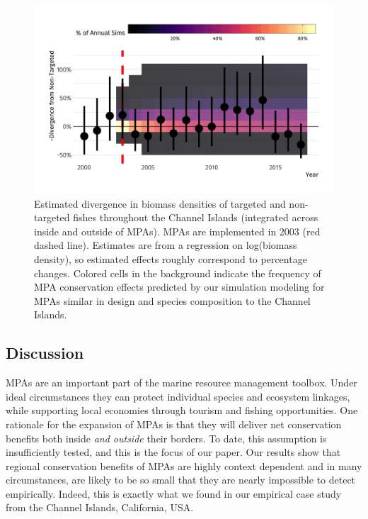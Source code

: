\documentclass[9pt,twocolumn,twoside,lineno]{pnas-new}
\begin{document}
\begin{figure}%
  \centering
  \includegraphics[width=1\linewidth]{figs/did_plot.png}
  \caption{Estimated divergence in biomass densities of targeted and non-targeted fishes throughout the Channel Islands (integrated across inside and outside of MPAs). MPAs are implemented in 2003 (red dashed line). Estimates are from a regression on log(biomass density), so estimated effects roughly correspond to percentage changes. Colored cells in the background indicate the frequency of MPA conservation effects predicted by our simulation modeling for MPAs similar in design and species composition to the Channel Islands.}
  \label{did-plot}
\end{figure}

\hypertarget{discussion}{%
\subsection*{Discussion}\label{discussion}}

MPAs are an important part of the marine resource management toolbox.
Under ideal circumstances they can protect individual species and
ecosystem linkages, while supporting local economies through tourism and
fishing opportunities. One rationale for the expansion of MPAs is that
they will deliver net conservation benefits both inside \emph{and
outside} their borders. To date, this assumption is insufficiently
tested, and this is the focus of our paper. Our results show that
regional conservation benefits of MPAs are highly context dependent and
in many circumstances, are likely to be so small that they are nearly
impossible to detect empirically. Indeed, this is exactly what we found
in our empirical case study from the Channel Islands, California, USA.
\end{document}
